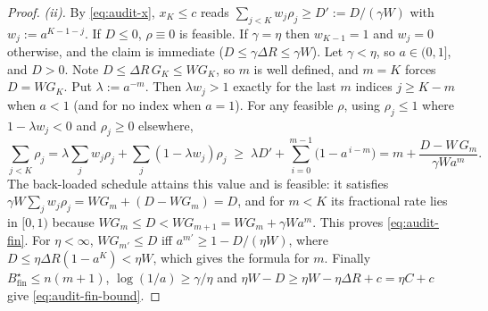 \begin{proof}
\emph{(ii).} By \eqref{eq:audit-x}, $x_K\le c$ reads
$\sum_{j<K}w_j\rho_j\ge D':=D/(\gamma W)$ with $w_j:=a^{K-1-j}$. If $D\le0$,
$\rho\equiv0$ is feasible. If $\gamma=\eta$ then $w_{K-1}=1$ and $w_j=0$
otherwise, and the claim is immediate ($D\le\gamma\Delta R\le\gamma W$). Let
$\gamma<\eta$, so $a\in(0,1]$, and $D>0$. Note $D\le\Delta R\,G_K\le W G_K$, so
$m$ is well defined, and $m=K$ forces $D=WG_K$. Put $\lambda:=a^{-m}$. Then
$\lambda w_j>1$ exactly for the last $m$ indices $j\ge K-m$ when $a<1$ (and for
no index when $a=1$). For any feasible $\rho$, using $\rho_j\le1$ where
$1-\lambda w_j<0$ and $\rho_j\ge0$ elsewhere,
\[
 \sum_{j<K}\rho_j=\lambda\sum_j w_j\rho_j+\sum_j(1-\lambda w_j)\rho_j
 \;\ge\;\lambda D'+\sum_{i=0}^{m-1}\bigl(1-a^{\,i-m}\bigr)
 = m+\frac{D-W\,G_m}{\gamma W a^m}.
\]
The back-loaded schedule attains this value and is feasible: it satisfies
$\gamma W\sum_jw_j\rho_j=WG_m+(D-WG_m)=D$, and for $m<K$ its fractional rate lies
in $[0,1)$ because $WG_m\le D<WG_{m+1}=WG_m+\gamma Wa^m$. This proves
\eqref{eq:audit-fin}. For $\eta<\infty$, $WG_{m'}\le D$ iff
$a^{m'}\ge1-D/(\eta W)$, where $D\le\eta\Delta R(1-a^K)<\eta W$, which gives the
formula for $m$. Finally $B^\star_{\mathrm{fin}}\le n(m+1)$,
$\log(1/a)\ge\gamma/\eta$ and $\eta W-D\ge\eta W-\eta\Delta R+c=\eta C+c$ give
\eqref{eq:audit-fin-bound}.
\end{proof}

